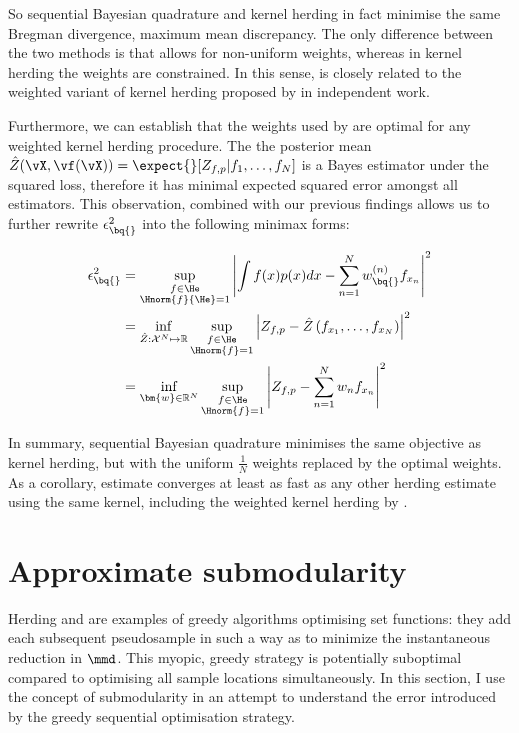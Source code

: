 So sequential Bayesian quadrature and kernel herding in fact minimise the same Bregman divergence, maximum mean discrepancy. The only difference between the two methods is that \sbq{} allows for non-uniform weights, whereas in kernel herding the weights are constrained. In this sense, \sbq{} is closely related to the weighted variant of kernel herding proposed by \citet{bach2012equivalence} in independent work.

Furthermore, we can establish that the weights used by \sbq{} are optimal for any weighted kernel herding procedure. The the posterior mean $\hat{Z}(\vX,\vf(\vX)) = \expect{}[{Z_{f,p}\vert f_1,\ldots,f_N}]$ is a Bayes estimator under the squared loss, therefore it has minimal expected squared error amongst all estimators. This observation, combined with our previous findings allows us to further rewrite $\epsilon^{2}_{\bq{}}$ into the following minimax forms:

\begin{align}
\epsilon^{2}_{\bq{}} &= \sup_{\substack{f\in\He\\\Hnorm{f}{\He}=1}} \left| \int f(x) p(x) dx - \sum_{n=1}^{N}w^{(n)}_{\bq{}} f_{x_n}\right|^2\\
	&= \inf_{\hat{Z}:\mathcal{X}^N\mapsto\mathbb{R}} \sup_{\substack{f\in\He\\\Hnorm{f}=1}} \left| Z_{f,p} - \hat{Z}\left(f_{x_1},\ldots,f_{x_N}\right)\right|^2\\
	&= \inf_{\bm{w}\in\mathbb{R}^N} \sup_{\substack{f\in\He\\\Hnorm{f}=1}} \left| Z_{f,p} - \sum_{n=1}^{N}w_n  f_{x_n}\right|^2
\end{align}

In summary, sequential Bayesian quadrature minimises the same objective as kernel herding, but with the uniform $\frac{1}{N}$ weights replaced by the optimal weights. As a corollary, \sbq{} estimate converges at least as fast as any other herding estimate using the same kernel, including the weighted kernel herding by \citet{bach2012equivalence}.

\section{Approximate submodularity}

Herding and \sbq{} are examples of greedy algorithms optimising set functions: they add each subsequent pseudosample in such a way as to minimize the instantaneous reduction in $\mmd$. This myopic, greedy strategy is potentially suboptimal compared to optimising all sample locations simultaneously. In this section, I use the concept of submodularity \citep[see \eg][]{KrauseCevher10} in an attempt to understand the error introduced by the greedy sequential optimisation strategy.

